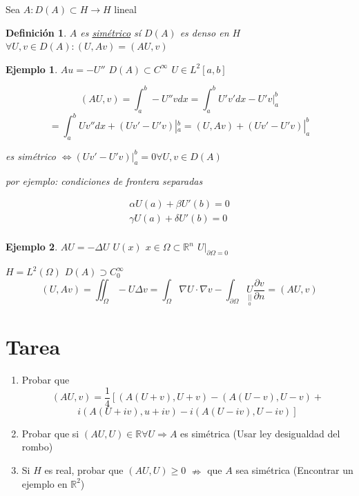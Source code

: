 \documentclass[a4paper,10pt]{book}
\newtheorem{ejemplo}{Ejemplo}
\newtheorem{definition}{Definición}
\begin{document}
Sea $A: D(A) \subset H \rightarrow H$ lineal  

\begin{definition}
    $A$ es \underline{simétrico} sí $D(A)$ es denso en $H$ 
    $\forall U,v \in D(A) : (U, Av)=(AU, v) $
\end{definition} 

\begin{ejemplo}
    $Au = -U''$ $D(A)\subset C^\infty$ $U\in L^2 [a,b] $

    \[
    (AU,v)= \int_a^b -U'' v dx = \int_a^b U'v' dx - U'v|_a^b
    \]
    \[
    =\int_a^b U v'' dx + (Uv' - U'v)|_a^b = (U,Av) + (U v'-U'v)|_a^b
    \]

es simétrico $\Leftrightarrow  (U v'-U'v)|_a^b=0 \forall U,v \in D(A)$ 

por ejemplo: condiciones de frontera separadas

\begin{align*}
  \alpha U(a) + \beta U'(b) = 0\\
  \gamma U(a) + \delta U'(b) = 0\\
\end{align*}

    
\end{ejemplo}

\begin{ejemplo}
    $AU= -\Delta U$ $U(x)$  $x\in \Omega \subset \mathbb{R}^n$  $U|_{\partial \Omega =0}$

    $H=L^2(\Omega)$ $D(A) \supset C_0^{\infty}$
    \[
    (U,Av)= \iint_\Omega -U \Delta v = \int_\Omega \nabla U\cdot \nabla v - \int _{\partial \Omega} \underset{\underset{0}{||}}{U} \frac{\partial v}{\partial n}  = (A U,v)
    \]
    
\end{ejemplo}



\section{Tarea}
\begin{enumerate}
    \item Probar que 
    \[
    (AU , v) = \frac{1}{4} \left[ (A(U+v) ,U+v) - (A(U-v),U-v) + \right.\]
    \[
    \left. i (A(U+iv),u+iv) - i (A(U-iv),U-iv) \right]
    \]
    \item 
    Probar que si $(AU,U) \in \mathbb{R} \forall U \Rightarrow A $ es simétrica
    (Usar ley desigualdad del rombo)
    \item Si $H$ es real, probar que $(AU, U)\geq 0$ $\nRightarrow $ que $A$ sea simétrica (Encontrar un ejemplo en $\mathbb{R}^2$) 
\end{enumerate}
\end{document}
